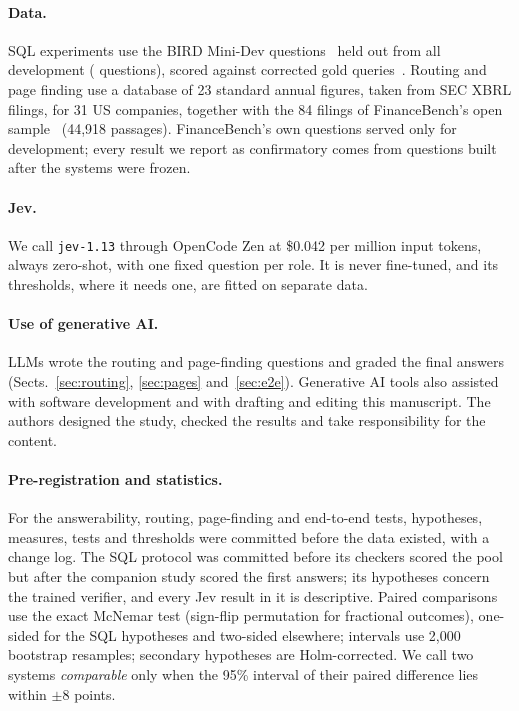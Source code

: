 \documentclass[runningheads,a4paper]{llncs}
\makeatletter
\newcommand{\N}[1]{\@ifundefined{pb@#1}{\textbf{??#1??}}{\csname pb@#1\endcsname}}
\makeatother
\begin{document}
\paragraph{Data.} SQL experiments use the BIRD Mini-Dev questions~\cite{li2023bird} held out from all development
(\N{sN} questions), scored against corrected gold queries~\cite{jin2026annotation}. Routing and page finding use a
database of 23 standard annual figures, taken from SEC XBRL filings, for 31 US companies, together with the 84
filings of FinanceBench's open sample~\cite{islam2023financebench} (44,918 passages). FinanceBench's own questions
served only for development; every result we report as confirmatory comes from questions built after the systems
were frozen.

\paragraph{Jev.} We call \texttt{jev-1.13} through OpenCode Zen at \$0.042 per million input tokens, always
zero-shot, with one fixed question per role. It is never fine-tuned, and its thresholds, where it needs one, are
fitted on separate data.

\paragraph{Use of generative AI.} LLMs wrote the routing and page-finding questions and graded the final answers
(Sects.~\ref{sec:routing}, \ref{sec:pages} and~\ref{sec:e2e}). Generative AI tools also assisted with software
development and with drafting and editing this manuscript. The authors designed the study, checked the results and
take responsibility for the content.

\paragraph{Pre-registration and statistics.} For the answerability, routing, page-finding and end-to-end tests,
hypotheses, measures, tests and thresholds were committed before the data existed, with a change log. The SQL
protocol was committed before its checkers scored the pool but after the companion study scored the first answers;
its hypotheses concern the trained verifier, and every Jev result in it is descriptive. Paired comparisons use the
exact McNemar test (sign-flip permutation for fractional outcomes), one-sided for the SQL hypotheses and two-sided
elsewhere; intervals use 2,000 bootstrap resamples; secondary hypotheses are Holm-corrected. We call two systems \emph{comparable}
only when the 95\% interval of their paired difference lies within $\pm$8 points.
\end{document}
